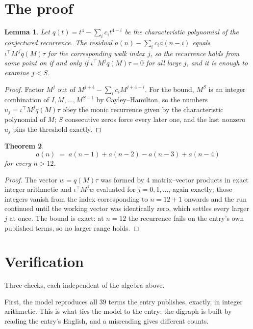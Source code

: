 \documentclass[11pt,a4paper]{article}
\theoremstyle{plain}
\newtheorem{theorem}{Theorem}
\newtheorem{lemma}[theorem]{Lemma}
\theoremstyle{definition}
\begin{document}
\section{The proof}

\begin{lemma}\label{lem:crit}
Let $q(t)=t^{4}-\sum_i c_it^{4-i}$ be the characteristic polynomial of the
conjectured recurrence. The residual $a(n)-\sum_ic_ia(n-i)$ equals
$\iota^{\!\top}M^{\,j}q(M)\tau$ for the corresponding walk index $j$, so the recurrence
holds from some point on if and only if $\iota^{\!\top}M^{j}q(M)\tau=0$ for all large $j$,
and it is enough to examine $j<S$.
\end{lemma}

\begin{proof}
Factor $M^{j}$ out of $M^{j+4}-\sum_ic_iM^{j+4-i}$. For the bound, $M^{S}$
is an integer combination of $I,M,\dots,M^{S-1}$ by Cayley--Hamilton, so the numbers
$u_j=\iota^{\!\top}M^{j}q(M)\tau$ obey the monic recurrence given by the characteristic
polynomial of $M$; $S$ consecutive zeros force every later one, and the last nonzero $u_j$
pins the threshold exactly.
\end{proof}

\begin{theorem}
\[
a(n)\;=\;a(n-1) + a(n-2) - a(n-3) + a(n-4)
\]
for every $n>12$.
\end{theorem}

\begin{proof}
The vector $w=q(M)\tau$ was formed by $4$ matrix--vector products in exact integer
arithmetic and $\iota^{\!\top}M^{j}w$ evaluated for $j=0,1,\dots$, again exactly; those
integers vanish from the index corresponding to $n=12+1$ onwards and the run continued
until the working vector was identically zero, which settles every larger $j$ at once. The bound is exact: at $n=12$ the recurrence fails on the entry's own published terms, so no larger range holds.
\end{proof}

\section{Verification}

Three checks, each independent of the algebra above.

First, the model reproduces all $39$ terms the entry publishes, exactly, in integer
arithmetic. This is what ties the model to the entry: the digraph is built by reading the
entry's English, and a misreading gives different counts.
\end{document}
